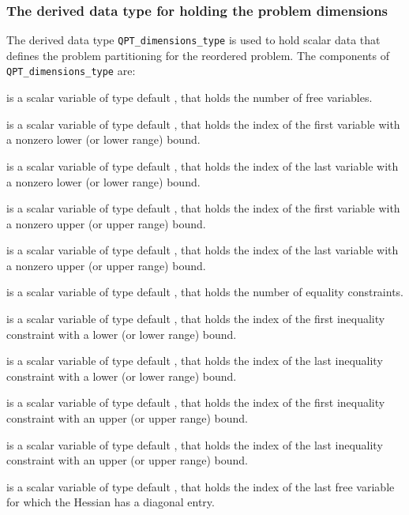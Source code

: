 \documentclass{galahad}
\begin{document}

\subsubsection{The derived data type for holding the problem dimensions}
\label{typeprob}
The derived data type
{\tt QPT\_dimensions\_type}
is used to hold scalar data that defines the problem partitioning for the
reordered problem.
The components of
{\tt QPT\_dimensions\_type}
are:

\begin{description}
 is a scalar variable of type default \integer, that holds the
number of free variables.

 is a scalar variable of type default \integer, that holds the
index of the first variable with a nonzero lower (or lower range) bound.

 is a scalar variable of type default \integer, that holds the
index of the last variable with a nonzero lower (or lower range) bound.

 is a scalar variable of type default \integer, that holds the
index of the first variable with a nonzero upper (or upper range) bound.

 is a scalar variable of type default \integer, that holds the
index of the last variable with a nonzero upper (or upper range) bound.

 is a scalar variable of type default \integer, that holds the
number of equality constraints.

 is a scalar variable of type default \integer, that holds the
index of the first inequality constraint with a lower (or lower range) bound.

 is a scalar variable of type default \integer, that holds the
index of the last inequality constraint with a lower (or lower range) bound.

 is a scalar variable of type default \integer, that holds the
index of the first inequality constraint with an upper (or upper range) bound.

 is a scalar variable of type default \integer, that holds the
index of the last inequality constraint with an upper (or upper range) bound.

 is a scalar variable of type default \integer,
that holds the index of the last free variable for which the Hessian has a
diagonal entry.


\end{description}
\end{document}
